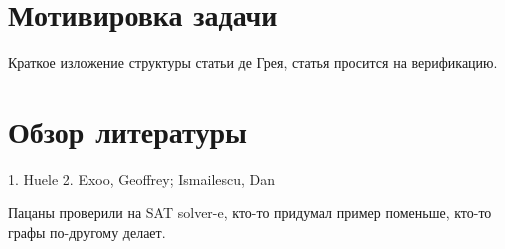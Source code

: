 \section{Мотивировка задачи} \label{sect1_2}

Краткое изложение структуры статьи де Грея, статья просится на верификацию.


\section{Обзор литературы}

1. Huele
2. Exoo, Geoffrey; Ismailescu, Dan 

Пацаны проверили на SAT solver-e, кто-то придумал пример поменьше, кто-то графы по-другому делает.


\newcommand{\actuality}{}


%
